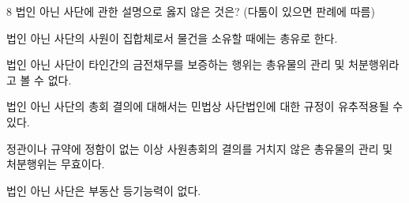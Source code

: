 \begin{question}{8}
법인 아닌 사단에 관한 설명으로 옳지 않은 것은? (다툼이 있으면 판례에 따름)
\begin{choices}
  \item 법인 아닌 사단의 사원이 집합체로서 물건을 소유할 때에는 총유로 한다.
  \item 법인 아닌 사단이 타인간의 금전채무를 보증하는 행위는 총유물의 관리 및 처분행위라고 볼 수 없다.
  \item 법인 아닌 사단의 총회 결의에 대해서는 민법상 사단법인에 대한 규정이 유추적용될 수 있다.
  \item 정관이나 규약에 정함이 없는 이상 사원총회의 결의를 거치지 않은 총유물의 관리 및 처분행위는 무효이다.
  \item 법인 아닌 사단은 부동산 등기능력이 없다.
\end{choices}
\end{question}
